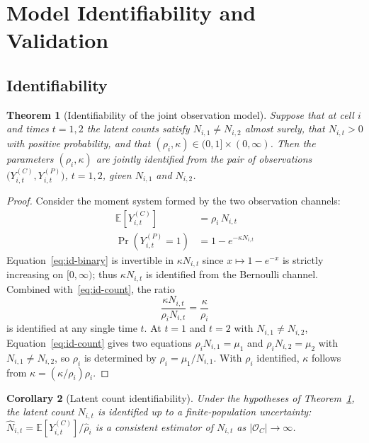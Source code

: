 \documentclass[12pt,a4paper]{article}
\newtheorem{theorem}{Theorem}
\newtheorem{corollary}[theorem]{Corollary}
\theoremstyle{definition}
\newcommand{\E}{\mathbb{E}}
\newcommand{\OC}{\mathcal{O}_C}
\begin{document}
\section{Model Identifiability and Validation}
\label{sec:validation}

\subsection{Identifiability}

\begin{theorem}[Identifiability of the joint observation model]
\label{thm:identifiability}
Suppose that at cell $i$ and times $t=1,2$ the latent counts satisfy
$N_{i,1} \neq N_{i,2}$ almost surely, that $N_{i,t} > 0$ with positive
probability, and that $(\rho_i, \kappa) \in (0,1] \times (0,\infty)$.
Then the parameters $(\rho_i, \kappa)$ are \emph{jointly identified} from
the pair of observations $\bigl(Y_{i,t}^{(C)}, Y_{i,t}^{(P)}\bigr)$,
$t=1,2$, given $N_{i,1}$ and $N_{i,2}$.
\end{theorem}

\begin{proof}
Consider the moment system formed by the two observation channels:
\begin{align}
  \E\!\left[Y_{i,t}^{(C)}\right] &= \rho_i\, N_{i,t}
  \label{eq:id-count}\\
  \Pr\!\left(Y_{i,t}^{(P)}=1\right) &= 1 - e^{-\kappa N_{i,t}}
  \label{eq:id-binary}
\end{align}
Equation~\eqref{eq:id-binary} is invertible in $\kappa N_{i,t}$ since
$x\mapsto 1-e^{-x}$ is strictly increasing on $[0,\infty)$; thus
$\kappa N_{i,t}$ is identified from the Bernoulli channel.
Combined with~\eqref{eq:id-count}, the ratio
\[
  \frac{\kappa N_{i,t}}{\rho_i N_{i,t}}
  = \frac{\kappa}{\rho_i}
\]
is identified at any single time $t$.  At $t=1$ and $t=2$ with
$N_{i,1} \neq N_{i,2}$, Equation~\eqref{eq:id-count} gives two equations
$\rho_i N_{i,1} = \mu_1$ and $\rho_i N_{i,2} = \mu_2$ with
$N_{i,1} \neq N_{i,2}$, so $\rho_i$ is determined by
$\rho_i = \mu_1 / N_{i,1}$.
With $\rho_i$ identified, $\kappa$ follows from $\kappa = (\kappa/\rho_i)\rho_i$.
\end{proof}

\begin{corollary}[Latent count identifiability]
\label{cor:latent-id}
Under the hypotheses of Theorem~\ref{thm:identifiability}, the latent count
$N_{i,t}$ is identified up to a finite-population uncertainty:
$\hat{N}_{i,t} = \E[Y_{i,t}^{(C)}]/\hat{\rho}_i$ is a consistent estimator
of $N_{i,t}$ as $|\OC| \to \infty$.
\end{corollary}
\end{document}
